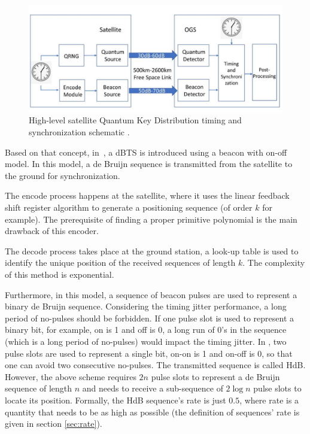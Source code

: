 \begin{figure}[htbp]
    \centering
    \includegraphics[scale=0.3]{fig/SatelliterQKD.png}
    \caption{High-level satellite Quantum Key Distribution timing and synchronization schematic \cite{zhang2021timing}.}
    \label{fig:qkd_satellite}
\end{figure}

Based on that concept, in~\cite{zhang2021timing}, a \gls{dBTS} is introduced using a beacon with on-off model. In this model, a de Bruijn sequence is transmitted from the satellite to the ground for synchronization. 

The encode process happens at the satellite, where it uses the linear feedback shift register algorithm to generate a positioning sequence (of order $k$ for example). The prerequisite of finding a proper primitive polynomial is the main drawback of this encoder. 

The decode process takes place at the ground station, a look-up table is used to identify the unique position of the received sequences of length $k$. The complexity of this method is exponential.

Furthermore, in this model, a sequence of beacon pulses are used to represent a binary de Bruijn sequence. Considering the timing jitter performance, a long period of no-pulses should be forbidden. If one pulse slot is used to represent a binary bit, for example, on is 1 and off is 0, a long run of 0's in the sequence (which is a long period of no-pulses) would impact the timing jitter. In \cite{zhang2021timing}, two pulse slots are used to represent a single bit, on-on is 1 and on-off is 0, so that one can avoid two consecutive no-pulses. The transmitted sequence is called \gls{HdB}. However, the above scheme requires $2n$ pulse slots to represent a de Bruijn sequence of length $n$ and needs to receive a sub-sequence of $2 \log n$ pulse slots to locate its position. Formally, the \gls{HdB} sequence's rate is just $0.5$, where rate is a quantity that needs to be as high as possible (the definition of sequences' rate is given in section \ref{sec:rate}).

